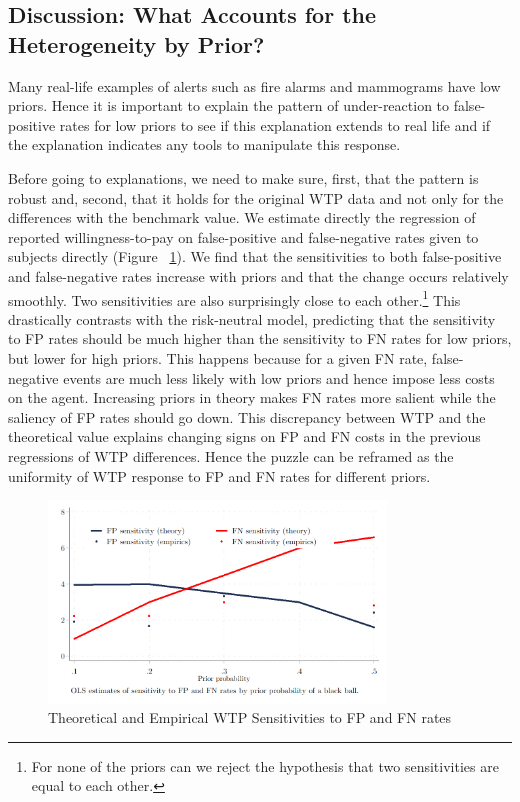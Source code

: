 \documentclass[12pt,a4paper]{article}
\begin{document}
\subsection{Discussion: What Accounts for the Heterogeneity by Prior?}

Many real-life examples of alerts such as fire alarms and mammograms have low priors. Hence it is important to explain the pattern of under-reaction to false-positive rates for low priors to see if this explanation extends to real life and if the explanation indicates any tools to manipulate this response.

Before going to explanations, we need to make sure, first, that the pattern is robust and, second, that it holds for the original WTP data and not only for the differences with the benchmark value. We estimate directly the regression of reported willingness-to-pay on false-positive and false-negative rates given to subjects directly (Figure ~\ref{fig:Comparison}). We find that the sensitivities to both false-positive and false-negative rates increase with priors and that the change occurs relatively smoothly. Two sensitivities are also surprisingly close to each other.\footnote{For none of the priors can we reject the hypothesis that two sensitivities are equal to each other.} This drastically contrasts with the risk-neutral model, predicting that the sensitivity to FP rates should be much higher than the sensitivity to FN rates for low priors, but lower for high priors. This happens because for a given FN rate, false-negative events are much less likely with low priors and hence impose less costs on the agent. Increasing priors in theory makes FN rates more salient while the saliency of FP rates should go down. This discrepancy between WTP and the theoretical value explains changing signs on FP and FN costs in the previous regressions of WTP differences. Hence the puzzle can be reframed as the uniformity of WTP response to FP and FN rates for different priors.


\begin{figure}[H]
\centering
\caption{Theoretical and Empirical WTP Sensitivities to FP and FN rates} \label{fig:Comparison}
\includegraphics[width=0.8\textwidth]{Graphs/sensit_comparison.png}
\end{figure}
\end{document}
